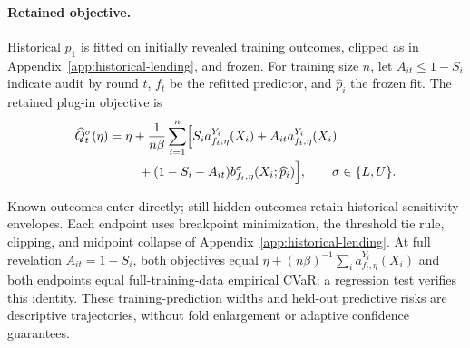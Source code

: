 \begin{samepage}
\paragraph{Retained objective.}
Historical $p_1$ is fitted on initially revealed training outcomes, clipped as in
Appendix~\ref{app:historical-lending}, and frozen. For training size $n$, let
$A_{it}\leq1-S_i$ indicate audit by round $t$, $f_t$ be the refitted predictor,
and $\widehat p_i$ the frozen fit. The retained plug-in objective is
\begin{equation}\label{eq:d:sequential-objective}
\begin{aligned}
\widehat Q_t^\sigma(\eta)
={}&\eta+\frac{1}{n\beta}\sum_{i=1}^n\Bigl[
 S_i a^{Y_i}_{f_t,\eta}(X_i)
 +A_{it}a^{Y_i}_{f_t,\eta}(X_i)\\
&\quad +(1-S_i-A_{it})b^\sigma_{f_t,\eta}(X_i;\widehat p_i)
\Bigr],\qquad \sigma\in\{L,U\}.
\end{aligned}
\end{equation}
\end{samepage}
Known outcomes enter directly; still-hidden outcomes retain historical
sensitivity envelopes. Each endpoint uses breakpoint minimization, the threshold
tie rule, clipping, and midpoint collapse of Appendix~\ref{app:historical-lending}.
At full revelation $A_{it}=1-S_i$, both objectives equal
$\eta+(n\beta)^{-1}\sum_i a^{Y_i}_{f_t,\eta}(X_i)$ and both endpoints equal
full-training-data empirical CVaR; a regression test verifies this identity.
These training-prediction widths and held-out predictive risks are descriptive
trajectories, without fold enlargement or adaptive confidence guarantees.


